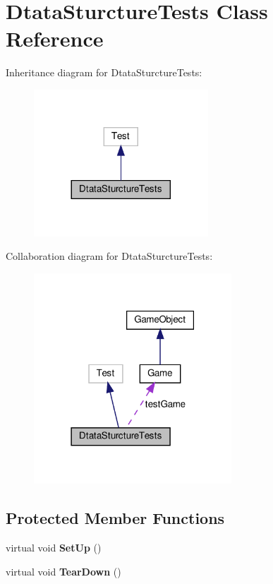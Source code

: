 \hypertarget{classDtataSturctureTests}{}\section{Dtata\+Sturcture\+Tests Class Reference}
\label{classDtataSturctureTests}


Inheritance diagram for Dtata\+Sturcture\+Tests\+:
\nopagebreak
\begin{figure}[H]
\begin{center}
\leavevmode
\includegraphics[width=185pt]{classDtataSturctureTests__inherit__graph}
\end{center}
\end{figure}


Collaboration diagram for Dtata\+Sturcture\+Tests\+:
\nopagebreak
\begin{figure}[H]
\begin{center}
\leavevmode
\includegraphics[width=210pt]{classDtataSturctureTests__coll__graph}
\end{center}
\end{figure}
\subsection*{Protected Member Functions}
\begin{DoxyCompactItemize}
\item 
\mbox{\label{classDtataSturctureTests_a21ca6b840c86158f8ffe18d027589cfa}} 
virtual void {\bfseries Set\+Up} ()
\item 
\mbox{\label{classDtataSturctureTests_aa04d5e31252060e099c8fd1345becd90}} 
virtual void {\bfseries Tear\+Down} ()
\end{DoxyCompactItemize}
